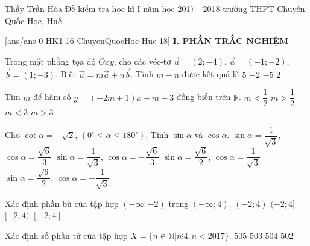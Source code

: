 
	\begin{name}
		{Thầy Trần Hòa}
		{Đề kiểm tra học kì I năm học 2017 - 2018 trường THPT Chuyên Quốc Học, Huế}
	\end{name}
	\setcounter{ex}{0}\setcounter{bt}{0}	
	[ans/ans-0-HK1-16-ChuyenQuocHoc-Hue-18]
\noindent\textbf{I. PHẦN TRẮC NGHIỆM}
\begin{ex}%
        Trong mặt phẳng tọa độ $Oxy$, cho các véc-tơ $\vec{u}=(2;-4)$, $\vec{a}=(-1;-2)$, $\vec{b}=(1;-3)$. Biết $\vec{u}=m\vec{a}+n\vec{b}$. Tính $m-n$ được kết quả là
        \choice        
        {$5$}
        {\True $-2$}
        {$-5$}
        {$2$}
\end{ex}
\begin{ex}%
        Tìm $m$ để hàm số $y=(-2m+1)x+m-3$ đồng biến trên $\mathbb{R}$.
        \choice        
        {\True $m<\dfrac{1}{2}$}
        {$m>\dfrac{1}{2}$}
        {$m<3$}
        {$m>3$}
\end{ex}
\begin{ex}%
        Cho $\cot \alpha =-\sqrt{2}$, $(0^\circ \le \alpha \le 180^\circ)$. Tính $\sin \alpha$ và $\cos \alpha$.
        \choice        
        {$\sin \alpha = \dfrac{1}{\sqrt{3}}$, $\cos \alpha = \dfrac{\sqrt{6}}{3}$}
        {\True $\sin \alpha = \dfrac{1}{\sqrt{3}}$, $\cos \alpha =- \dfrac{\sqrt{6}}{3}$}
        {$\sin \alpha =\dfrac{\sqrt{6}}{2}$, $\cos \alpha = \dfrac{1}{\sqrt{3}}$}
        {$\sin \alpha =\dfrac{\sqrt{6}}{2}$, $\cos \alpha = -\dfrac{1}{\sqrt{3}}$}
\end{ex}
\begin{ex}%
        Xác định phần bù của tập hợp $(-\infty;-2)$ trong $(-\infty; 4)$.
        \choice        
        {$(-2;4)$}
        {$(-2;4]$}
        {\True $[-2;4)$}
        {$[-2;4]$}
	\loigiai{
	$(-\infty; 4)\backslash (-\infty;-2) =[-2;4)$.	
	}
\end{ex}\begin{ex}%
        Xác định số phần tử của tập hợp $X=\{n\in \mathbb{N}|n \vdots 4, n<2017\}$.
        \choice        
        {\True $505$}
        {$503$}
        {$504$}
        {$502$}
\end{ex}
